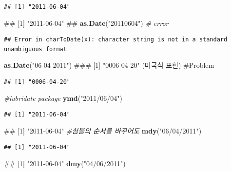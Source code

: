 \documentclass[10pt,]{krantz}
\makeatletter
\newenvironment{Shaded}{\begin{snugshade}}{\end{snugshade}}
\newcommand{\KeywordTok}[1]{\textcolor[rgb]{0.13,0.29,0.53}{\textbf{#1}}}
\newcommand{\StringTok}[1]{\textcolor[rgb]{0.31,0.60,0.02}{#1}}
\newcommand{\CommentTok}[1]{\textcolor[rgb]{0.56,0.35,0.01}{\textit{#1}}}
\newcommand{\NormalTok}[1]{#1}
\newenvironment{kframe}{%
\medskip{}
\setlength{\fboxsep}{.8em}
 \def\at@end@of@kframe{}%
 \ifinner\ifhmode%
  \def\at@end@of@kframe{\end{minipage}}%
  \begin{minipage}{\columnwidth}%
 \fi\fi%
 \def\FrameCommand##1{\hskip\@totalleftmargin \hskip-\fboxsep
 \colorbox{shadecolor}{##1}\hskip-\fboxsep
     \hskip-\linewidth \hskip-\@totalleftmargin \hskip\columnwidth}%
 \MakeFramed {\advance\hsize-\width
   \@totalleftmargin\z@ \linewidth\hsize
   \@setminipage}}%
 {\par\unskip\endMakeFramed%
 \at@end@of@kframe}
\renewenvironment{Shaded}{\begin{kframe}}{\end{kframe}}
\makeatother
\begin{document}
\begin{verbatim}
## [1] "2011-06-04"
\end{verbatim}

\begin{Shaded}
\begin{Highlighting}[]
\NormalTok{## [1] "2011-06-04"}
\NormalTok{## }
\KeywordTok{as.Date}\NormalTok{(}\StringTok{"20110604"}\NormalTok{) }\CommentTok{# error }
\end{Highlighting}
\end{Shaded}

\begin{verbatim}
## Error in charToDate(x): character string is not in a standard unambiguous format
\end{verbatim}

\begin{Shaded}
\begin{Highlighting}[]
\KeywordTok{as.Date}\NormalTok{(}\StringTok{"06-04-2011"}\NormalTok{) ### [1] "0006-04-20" (미국식 표현) #Problem}
\end{Highlighting}
\end{Shaded}

\begin{verbatim}
## [1] "0006-04-20"
\end{verbatim}

\begin{Shaded}
\begin{Highlighting}[]
\CommentTok{#lubridate package }
\KeywordTok{ymd}\NormalTok{(}\StringTok{"2011/06/04"}\NormalTok{)}
\end{Highlighting}
\end{Shaded}

\begin{verbatim}
## [1] "2011-06-04"
\end{verbatim}

\begin{Shaded}
\begin{Highlighting}[]
\NormalTok{## [1] "2011-06-04"}
\CommentTok{#심볼의 순서를 바꾸어도}
\KeywordTok{mdy}\NormalTok{(}\StringTok{"06/04/2011"}\NormalTok{)}
\end{Highlighting}
\end{Shaded}

\begin{verbatim}
## [1] "2011-06-04"
\end{verbatim}

\begin{Shaded}
\begin{Highlighting}[]
\NormalTok{## [1] "2011-06-04"}
\KeywordTok{dmy}\NormalTok{(}\StringTok{"04/06/2011"}\NormalTok{)}
\end{Highlighting}
\end{Shaded}
\end{document}
